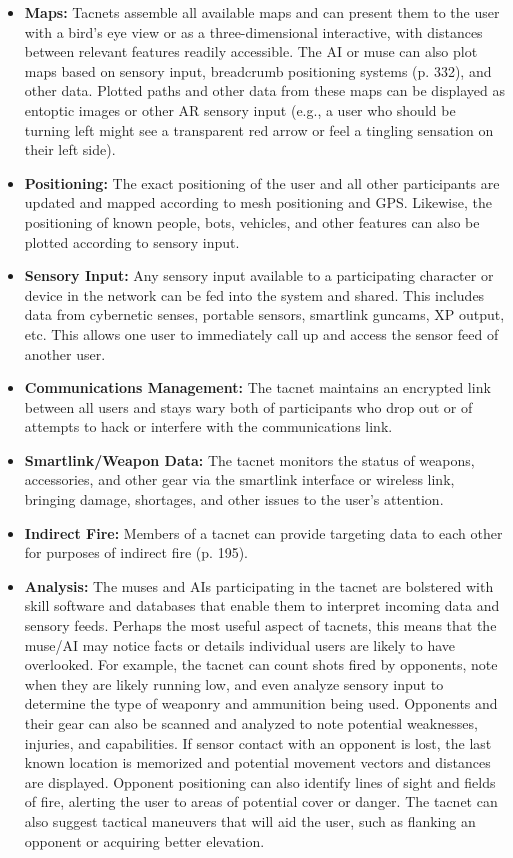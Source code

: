 \begin{itemize}
\item \textbf{Maps:} Tacnets assemble all available maps and can present them to the user with a bird’s eye view or as a three-dimensional interactive, with distances between relevant features readily accessible. The AI or muse can also plot maps based on sensory input, breadcrumb positioning systems (p. 332), and other data. Plotted paths and other data from these maps can be displayed as entoptic images or other AR sensory input (e.g., a user who should be turning left might see a transparent red arrow or feel a tingling sensation on their left side).
\item \textbf{Positioning:} The exact positioning of the user and all other participants are updated and mapped according to mesh positioning and GPS. Likewise, the positioning of known people, bots, vehicles, and other features can also be plotted according to sensory input.
\item \textbf{Sensory Input:} Any sensory input available to a participating character or device in the network can be fed into the system and shared. This includes data from cybernetic senses, portable sensors, smartlink guncams, XP output, etc. This allows one user to immediately call up and access the sensor feed of another user.
\item \textbf{Communications Management:} The tacnet maintains an encrypted link between all users and stays wary both of participants who drop out or of attempts to hack or interfere with the communications link.
\item \textbf{Smartlink/Weapon Data:} The tacnet monitors the status of weapons, accessories, and other gear via the smartlink interface or wireless link, bringing damage, shortages, and other issues to the user’s attention.
\item \textbf{Indirect Fire:} Members of a tacnet can provide targeting data to each other for purposes of indirect fire (p. 195).
\item \textbf{Analysis:} The muses and AIs participating in the tacnet are bolstered with skill software and databases that enable them to interpret incoming data and sensory feeds. Perhaps the most useful aspect of tacnets, this means that the muse/AI may notice facts or details individual users are likely to have overlooked. For example, the tacnet can count shots fired by opponents, note when they are likely running low, and even analyze sensory input to determine the type of weaponry and ammunition being used. Opponents and their gear can also be scanned and analyzed to note potential weaknesses, injuries, and capabilities. If sensor contact with an opponent is lost, the last known location is memorized and potential movement vectors and distances are displayed. Opponent positioning can also identify lines of sight and fields of fire, alerting the user to areas of potential cover or danger. The tacnet can also suggest tactical maneuvers that will aid the user, such as flanking an opponent or acquiring better elevation.
\end{itemize}


